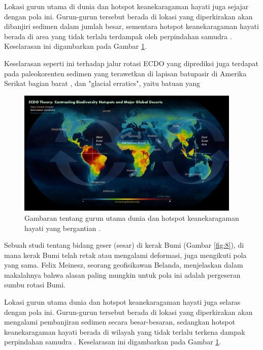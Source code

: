 \documentclass[10pt,twocolumn,letterpaper]{article}
\begin{document}
Lokasi gurun utama di dunia dan hotspot keanekaragaman hayati juga sejajar dengan pola ini. Gurun-gurun tersebut berada di lokasi yang diperkirakan akan dibanjiri sedimen dalam jumlah besar, sementara hotspot keanekaragaman hayati berada di area yang tidak terlalu terdampak oleh perpindahan samudra \cite{28}. Keselarasan ini digambarkan pada Gambar \ref{fig:9}.

Keselarasan seperti ini terhadap jalur rotasi ECDO yang diprediksi juga terdapat pada paleokorenten sedimen yang terawetkan di lapisan batupasir di Amerika Serikat bagian barat \cite{21}, dan "glacial erratics", yaitu batuan yang\begin{figure}[t]
\begin{center}
\includegraphics[width=0.95\textwidth]{biodiversity.jpg}
\end{center}
   \caption{Gambaran tentang gurun utama dunia dan hotspot keanekaragaman hayati yang bergantian \cite{28}.}
\label{fig:9}
\end{figure}

Sebuah studi tentang bidang geser (sesar) di kerak Bumi (Gambar \ref{fig:8}), di mana kerak Bumi telah retak atau mengalami deformasi, juga mengikuti pola yang sama. Felix Meinesz, seorang geofisikawan Belanda, menjelaskan dalam makalahnya \cite{36} bahwa alasan paling mungkin untuk pola ini adalah pergeseran sumbu rotasi Bumi.

Lokasi gurun utama dunia dan hotspot keanekaragaman hayati juga selaras dengan pola ini. Gurun-gurun tersebut berada di lokasi yang diperkirakan akan mengalami pembanjiran sedimen secara besar-besaran, sedangkan hotspot keanekaragaman hayati berada di wilayah yang tidak terlalu terkena dampak perpindahan samudra \cite{28}. Keselarasan ini digambarkan pada Gambar \ref{fig:9}.
\end{document}
